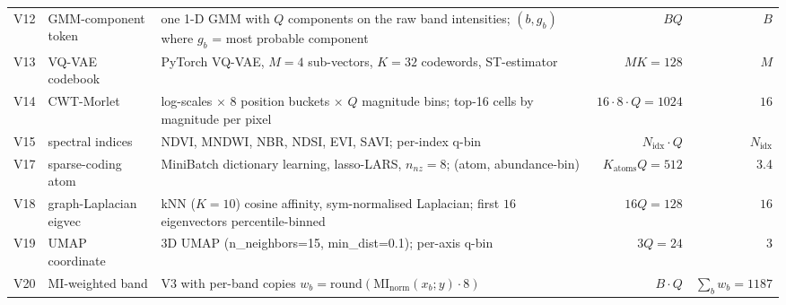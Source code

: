 \documentclass[journal,a4paper,10pt]{IEEEtran}
\begin{document}
\begin{table}[t]
\begin{tabular}{l>{\raggedright\arraybackslash}p{}>{\raggedright\arraybackslash}p{}rr}
V12 & GMM-component token     & one 1-D GMM with $Q$ components on the raw band intensities; $(b, g_b)$ where $g_b$ = most probable component & $B Q$ & $B$ \\
V13 & VQ-VAE codebook         & PyTorch VQ-VAE, $M=4$ sub-vectors, $K=32$ codewords, ST-estimator & $M K = 128$ & $M$ \\
V14 & CWT-Morlet              & 16 log-scales $\times$ 8 position buckets $\times$ $Q$ magnitude bins; top-16 cells by magnitude per pixel & $16 \cdot 8 \cdot Q = 1024$ & $16$ \\
V15 & spectral indices        & NDVI, MNDWI, NBR, NDSI, EVI, SAVI; per-index q-bin & $N_{\text{idx}} \cdot Q$ & $N_{\text{idx}}$ \\
V17 & sparse-coding atom      & MiniBatch dictionary learning, lasso-LARS, $n_{nz}=8$; (atom, abundance-bin) & $K_{\text{atoms}} Q = 512$ & 3.4 \\
V18 & graph-Laplacian eigvec  & kNN ($K=10$) cosine affinity, sym-normalised Laplacian; first $16$ eigenvectors percentile-binned & $16 Q = 128$ & $16$ \\
V19 & UMAP coordinate         & 3D UMAP (n\_neighbors=15, min\_dist=0.1); per-axis q-bin & $3 Q = 24$ & $3$ \\
V20 & MI-weighted band        & V3 with per-band copies $w_b = \mathrm{round}(\mathrm{MI}_{\mathrm{norm}}(x_b; y) \cdot 8)$ & $B \cdot Q$ & $\sum_b w_b = 1187$ \\
\bottomrule
\end{tabular}
\end{table}
\end{document}
